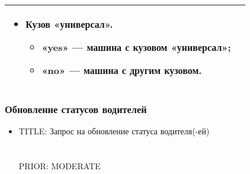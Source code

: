 \begin{longtable}{|p{4cm}|p{9cm}|}
\begin{itemize}
\begin{itemize}
															\end{itemize}
														\item Кузов «универсал».
															\begin{itemize} 
																\item «yes» — машина с кузовом «универсал»;
																\item «no» — машина с другим кузовом.
															\end{itemize}
													\end{itemize} \\ [2mm]
					\hline 
				\end{longtable}

		\subsubsection{Обновление статусов водителей}

			\begin{itemize}

				\item{
					TITLE: Запрос на обновление статуса водителя(-ей)\\
					\\
					\\
					PRIOR: MODERATE\\
				}

			\end{itemize}

